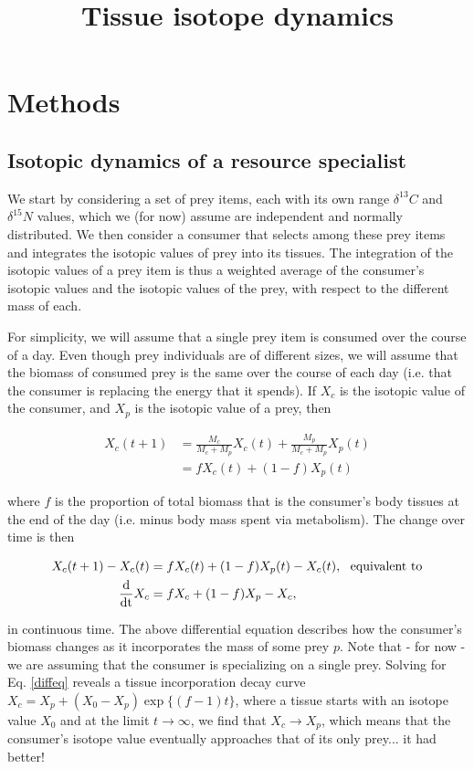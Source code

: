 \documentclass[11pt]{article}
\begin{document}
\title{Tissue isotope dynamics}

\maketitle

\section{Methods}

\subsection{Isotopic dynamics of a resource specialist}

We start by considering a set of prey items, each with its own range $\delta^{13}C$ and $\delta^{15}N$ values, which we (for now) assume are independent and normally distributed.
We then consider a consumer that selects among these prey items and integrates the isotopic values of prey into its tissues.
The integration of the isotopic values of a prey item is thus a weighted average of the consumer's isotopic values and the isotopic values of the prey, with respect to the different mass of each.

For simplicity, we will assume that a single prey item is consumed over the course of a day.
Even though prey individuals are of different sizes, we will assume that the biomass of consumed prey is the same over the course of each day (i.e. that the consumer is replacing the energy that it spends). 
If $X_c$ is the isotopic value of the consumer, and $X_p$ is the isotopic value of a prey, then

\begin{align}
	X_c(t+1) &= \frac{M_c}{M_c + M_p}X_c(t) + \frac{M_p}{M_c + M_p}X_p(t) \\ \nonumber
	&= fX_c(t) + (1-f)X_p(t)
\end{align}

\noindent where $f$ is the proportion of total biomass that is the consumer's body tissues at the end of the day (i.e. minus body mass spent via metabolism).
The change over time is then

\begin{align}
\label{diffeq}
	X_c(t+1) - X_c(t) &= fX_c(t) + (1-f)X_p(t) - X_c(t),~~\mbox{equivalent to} \\
	\frac{\rm d}{\rm dt}X_c &= fX_c + (1-f)X_p - X_c,
\end{align}

\noindent in continuous time. 
The above differential equation describes how the consumer's biomass changes as it incorporates the mass of some prey $p$.
Note that - for now - we are assuming that the consumer is specializing on a single prey.
Solving for Eq. \ref{diffeq} reveals a tissue incorporation decay curve $X_c = X_p + (X_0-X_p)\exp\{(f-1)t\}$, where a tissue starts with an isotope value $X_0$ and at the limit $t\rightarrow \infty $, we find that $X_c \rightarrow X_p$, which means that the consumer's isotope value eventually approaches that of its only prey... it had better!
\end{document}
